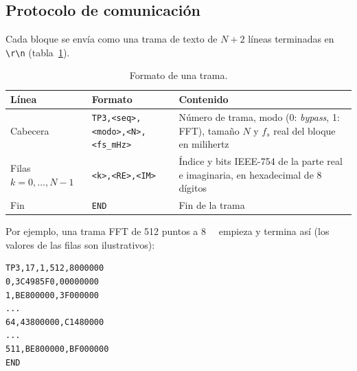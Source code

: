 \documentclass[11pt,a4paper]{article}
\begin{document}
\subsection{Protocolo de comunicación}\label{sec:protocolo}

Cada bloque se envía como una trama de texto de $N+2$ líneas terminadas en
\verb|\r\n| (tabla~\ref{tab:trama}).

\begin{table}[H]
\centering
\caption{Formato de una trama.}
\label{tab:trama}
\small
\begin{tabular}{@{}l l p{6.2cm}@{}}
\toprule
\textbf{Línea} & \textbf{Formato} & \textbf{Contenido}\\
\midrule
Cabecera & \texttt{TP3,<seq>,<modo>,<N>,<fs\_mHz>}
         & Número de trama, modo (0: \emph{bypass}, 1: FFT), tamaño $N$ y
           $f_s$ real del bloque en milihertz\\
Filas $k = 0, \dots, N-1$ & \texttt{<k>,<RE>,<IM>}
         & Índice y bits IEEE-754 de la parte real e imaginaria, en
           hexadecimal de 8 dígitos\\
Fin      & \texttt{END} & Fin de la trama\\
\bottomrule
\end{tabular}
\end{table}

Por ejemplo, una trama FFT de 512 puntos a \qty{8}{\kilo\sps} empieza y
termina así (los valores de las filas son ilustrativos):

\begin{lstlisting}[numbers=none,caption={Ejemplo de trama.},label={lst:trama}]
TP3,17,1,512,8000000
0,3C4985F0,00000000
1,BE800000,3F000000
...
64,43800000,C1480000
...
511,BE800000,BF000000
END
\end{lstlisting}
\end{document}
